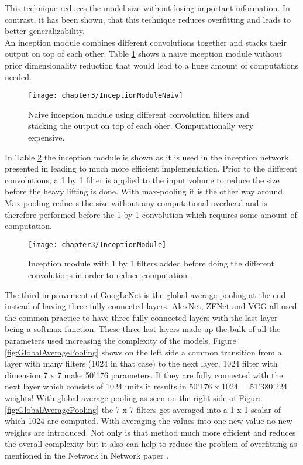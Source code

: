 This technique reduces the model size without losing important information. In contrast, it has been shown, that this technique reduces overfitting and leads to better generalizability.\\

An inception module combines different convolutions together and stacks their output on top of each other. Table \ref{fig:InceptionModuleNaiv} shows a naive inception module without prior dimensionality reduction that would lead to a huge amount of computations needed. 

\begin{figure}[H]
  \centering
  \caption{Naive inception module using different convolution filters and stacking the output on top of each oher. Computationally very expensive. \cite{ReviewGoogleLeNetv1}}
  \texttt{[image: chapter3/InceptionModuleNaiv]}
  \label{fig:InceptionModuleNaiv}
\end{figure}

In Table \ref{fig:InceptionModule} the inception module is shown as it is used in the inception network presented in \cite{szegedy2015going} leading to much more efficient implementation. Prior to the different convolutions, a 1 by 1 filter is applied to the input volume to reduce the size before the heavy lifting is done. With max-pooling it is the other way around. Max pooling reduces the size without any computational overhead and is therefore performed before the 1 by 1 convolution which requires some amount of computation.

\begin{figure}[H]
  \centering
  \caption{Inception module with 1 by 1 filters added before doing the different convolutions in order to reduce computation. \cite{ReviewGoogleLeNetv1}}
  \texttt{[image: chapter3/InceptionModule]}
  \label{fig:InceptionModule}
\end{figure}

The third improvement of GoogLeNet is the global average pooling at the end instead of having three fully-connected layers. AlexNet, ZFNet and VGG all used the common practice to have three fully-connected layers with the last layer being a softmax function. These three last layers made up the bulk of all the parameters used increasing the complexity of the models. Figure \ref{fig:GlobalAveragePooling} shows on the left side a common transition from a layer with many filters (1024 in that case) to the next layer. 1024 filter with dimension 7 x 7 make 50'176 parameters. If they are fully connected with the next layer which consists of 1024 units it results in 50'176 x 1024 = 51'380'224 weights! With global average pooling as seen on the right side of Figure \ref{fig:GlobalAveragePooling} the 7 x 7 filters get averaged into a 1 x 1 scalar of which 1024 are computed. With averaging the values into one new value no new weights are introduced. Not only is that method much more efficient and reduces the overall complexity but it also can help to reduce the problem of overfitting as mentioned in the Network in Network paper \cite{lin2013network}.

